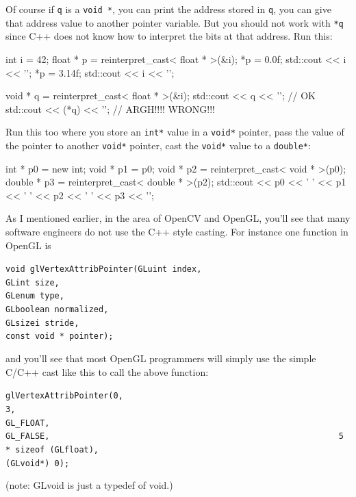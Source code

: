 \begin{center}
\end{center}

Of course if \texttt{q} is a \texttt{void *}, you can print the address
stored in \texttt{q}, you can give that address value to another pointer
variable. But you should not work with \texttt{*q} since C++ does not know
how to interpret the bits at that address. Run this:

\begin{console}
int i = 42;
float * p = reinterpret_cast< float * >(&i);
*p = 0.0f;
std::cout << i << '\n';
*p = 3.14f;
std::cout << i << '\n';

void * q = reinterpret_cast< float * >(&i);
std::cout << q << '\n';    // OK
std::cout << (*q) << '\n'; // ARGH!!!! WRONG!!!
\end{console}

Run this too where you store an \texttt{int*} value in a \texttt{void*} pointer, pass the value of the pointer to another \texttt{void*} pointer, cast the \texttt{void*} value to a \texttt{double*}:

\begin{console}
int * p0 = new int;
void * p1 = p0;
void * p2 = reinterpret_cast< void * >(p0);
double * p3 = reinterpret_cast< double * >(p2);
std::cout << p0 << ' ' << p1 << ' ' << p2 << ' '
          << p3 << '\n';
\end{console}

As I mentioned earlier, in the area of OpenCV and OpenGL, you'll see
that many software engineers do not use the C++ style casting. For
instance one function in OpenGL is
\begin{center}
\verb!void glVertexAttribPointer(GLuint index,                                                                   GLint size,                                                                     GLenum type,                                                                    GLboolean normalized,                                                           GLsizei stride,                                                                 const void * pointer);!
\end{center}
and you'll see that most OpenGL programmers will simply use the simple
C/C++ cast like this to call the above function:
\begin{center}
\verb!glVertexAttribPointer(0,                                                                              3,                                                                       GL_FLOAT,                                                                       GL_FALSE,                                                           5 * sizeof (GLfloat),                                                                   (GLvoid*) 0);!
\end{center}

(note: GLvoid is just a typedef of void.)

